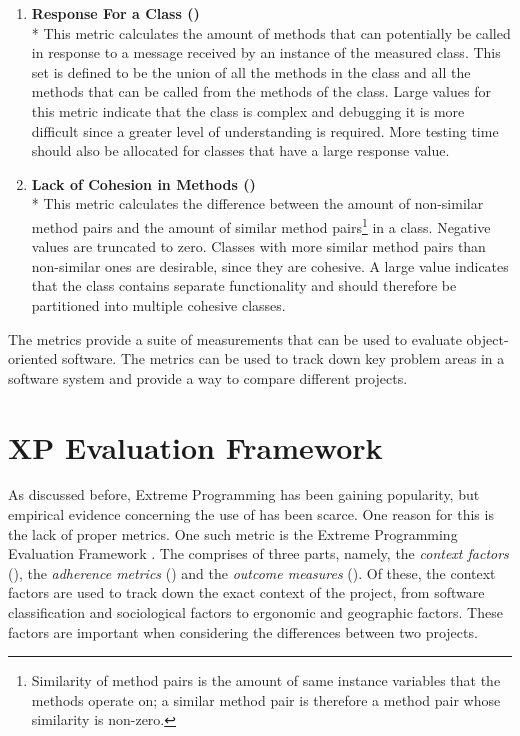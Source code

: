 \begin{enumerate}
\item \textbf{Response For a Class ()}\\* This metric 
calculates the amount of methods that can potentially be called in 
response to a message received by an instance of the measured class. 
This set is defined to be the union of all the methods in the class 
and all the methods that can be called from the methods of the class. 
Large values for this metric indicate that the class is complex and 
debugging it is more difficult since a greater level of understanding 
is required. More testing time should also be allocated for classes 
that have a large response value.

\item \textbf{Lack of Cohesion in Methods ()}\\* This 
metric calculates the difference between the amount of non-similar 
method pairs and the amount of similar method 
pairs\footnote{Similarity of method pairs is the amount of same 
instance variables that the methods operate on; a similar method pair 
is therefore a method pair whose similarity is non-zero.} in a class. 
Negative values are truncated to zero. Classes with more similar 
method pairs than non-similar ones are desirable, since they are 
cohesive. A large  value indicates that the class 
contains separate functionality and should therefore be partitioned 
into multiple cohesive classes.

\end{enumerate}

The  metrics provide a suite of measurements that can be 
used to evaluate object-oriented software. The metrics can be used to 
track down key problem areas in a software system and provide a way to 
compare different projects.



\section{XP Evaluation Framework}
\label{toc:evaluation:xpef}

As discussed before, Extreme Programming has been gaining popularity, 
but empirical evidence concerning the use of  has been 
scarce. One reason for this is the lack of proper metrics. One such 
metric is the Extreme Programming Evaluation Framework 
\citep{xpevaluationfw}. The  comprises of three parts, 
namely, the  \textsl{context factors} (), the
 \textsl{adherence metrics} () and the 
\textsl{outcome measures} (). Of these, the  
context factors are used to track down the exact context of the 
project, from software classification and sociological factors to 
ergonomic and geographic factors. These factors are important when 
considering the differences between two projects.

